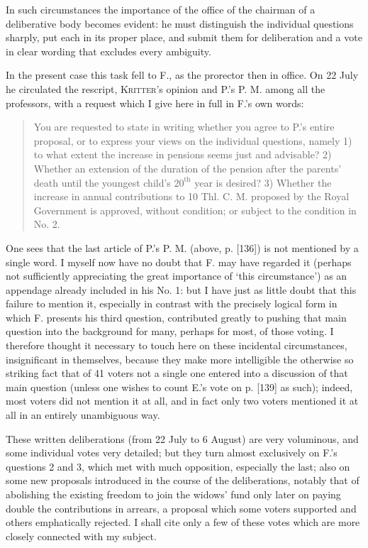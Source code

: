 \par{}
In such circumstances the importance of the office of the chairman of a deliberative body becomes evident: he must distinguish the individual questions sharply, put each in its proper place, and submit them for deliberation and a vote in clear wording that excludes every ambiguity.

In the present case this task fell to F., as the prorector then in office. On 22 July he circulated the rescript, \textsc{Kritter}'s opinion and P.'s P. M. among all the professors, with a request which I give here in full in F.'s own words:
\begin{quote}
You are requested to state in writing whether you agree to P.'s entire proposal, or to express your views on the individual questions, namely 1) to what extent the increase in pensions seems just and advisable? 2) Whether an extension of the duration of the pension after the parents' death until the youngest child's \(20^{\text{th}}\) year is desired? 3) Whether the increase in annual contributions to 10 Thl. C. M. proposed by the Royal Government is approved, without condition; or subject to the condition in No. 2.
\end{quote}
\noindent\hspace*{\parindent}One sees that the last article of P.'s P. M. (above, p. [136]) is not mentioned by a single word. I myself now have no doubt that F. may have regarded it (perhaps not sufficiently appreciating the great importance of ‘this circumstance’) as an appendage already included in his No. 1: but I have just as little doubt that this failure to mention it, especially in contrast with the precisely logical form in which F. presents his third question, contributed greatly to pushing that main question into the background for many, perhaps for most, of those voting. I therefore thought it necessary to touch here on these incidental circumstances, insignificant in themselves, because they make more intelligible the otherwise so striking fact that of 41 voters not a single one entered into a discussion of that main question (unless one wishes to count E.'s vote on p. [139] as such); indeed, most voters did not mention it at all, and in fact only two voters mentioned it at all in an entirely unambiguous way.

These written deliberations (from 22 July to 6 August) are very voluminous, and some individual votes very detailed; but they turn almost exclusively on F.'s questions 2 and 3, which met with much opposition, especially the last; also on some new proposals introduced in the course of the deliberations, notably that of abolishing the existing freedom to join the widows' fund only later on paying double the contributions in arrears, a proposal which some voters supported and others emphatically rejected. I shall cite only a few of these votes which are more closely connected with my subject.

